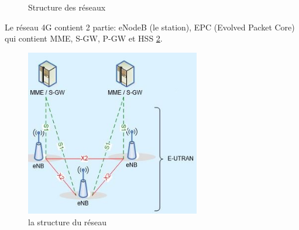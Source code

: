 \begin{figure}[H]
	\centering
	\hfill
	\hspace{1in}
	\caption{Structure des réseaux} 
		\label{Fig.3G}
\end{figure}

Le réseau 4G contient 2 partie: eNodeB (le station), EPC (Evolved Packet Core) qui contient MME, S-GW, P-GW et HSS \ref{structure4G}.
      \begin{figure}[H]
          \centering
          \includegraphics[width=3in]{images/enb.jpg}
          \caption{la structure du réseau}
          \label{structure4G}
      \end{figure}